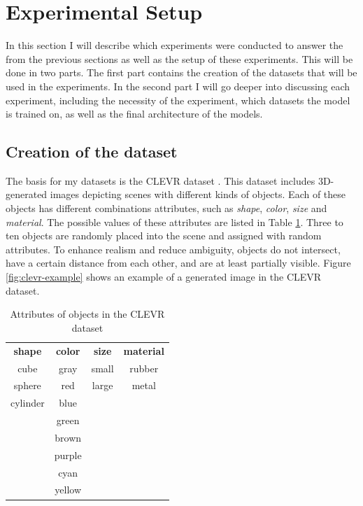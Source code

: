 \section{Experimental Setup}
\label{sec:exp-setup}


In this section I will describe which experiments were conducted to answer the  from the previous sections as well as the setup of these experiments.
This will be done in two parts.
The first part contains the creation of the datasets that will be used in the experiments.
In the second part I will go deeper into discussing each experiment, including the necessity of the experiment, which datasets the model is trained on, as well as the final architecture of the models.

\subsection{Creation of the dataset}
The basis for my datasets is the CLEVR dataset \citep{Johnson2016}.
This dataset includes 3D-generated images depicting scenes with different kinds of objects.
Each of these objects has different combinations attributes, such as \emph{shape}, \emph{color}, \emph{size} and \emph{material}.
The possible values of these attributes are listed in Table \ref{tab:clevr-attributes}.
Three to ten objects are randomly placed into the scene and assigned with random attributes.
To enhance realism and reduce ambiguity, objects do not intersect, have a certain distance from each other, and are at least partially visible.
Figure \ref{fig:clevr-example} shows an example of a generated image in the CLEVR dataset.

\begin{table}[h]
    \centering
    \begin{tabular}{cccc}
        \toprule
        \textbf{ shape } & \textbf{ color } & \textbf{ size } & \textbf{ material } \\
        cube             & gray             & small           & rubber              \\
        sphere           & red              & large           & metal               \\
        cylinder         & blue                                                     \\
                         & green                                                    \\
                         & brown                                                    \\
                         & purple                                                   \\
                         & cyan                                                     \\
                         & yellow                                                   \\
        \bottomrule
    \end{tabular}
    \caption{Attributes of objects in the CLEVR dataset}
    \label{tab:clevr-attributes}
\end{table}

